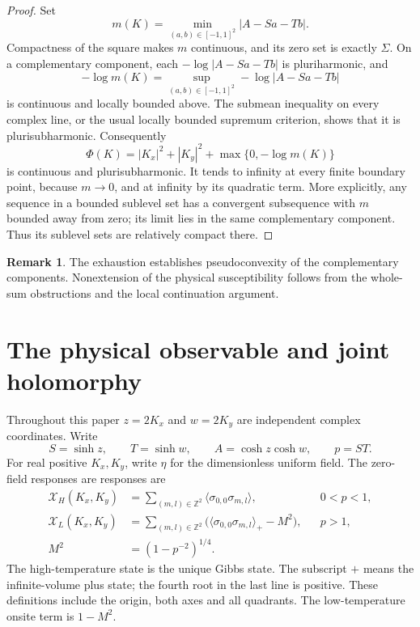 \documentclass[11pt]{article}
\numberwithin{equation}{section}
\theoremstyle{definition}
\newtheorem{remark}[theorem]{Remark}
\newcommand{\Z}{\mathbb Z}
\newcommand{\XH}{\mathcal X_H}
\newcommand{\XL}{\mathcal X_L}
\begin{document}
\begin{proof}
Set
\[
 m(K)=\min_{(a,b)\in[-1,1]^2}|A-Sa-Tb|.
\]
Compactness of the square makes \(m\) continuous, and
its zero set is exactly \(\Sigma\).
On a complementary component, each
\(-\log|A-Sa-Tb|\) is pluriharmonic, and
\[
 -\log m(K)=
       \sup_{(a,b)\in[-1,1]^2}-\log|A-Sa-Tb|
\]
is continuous and locally bounded above.
The submean inequality on every complex line, or the
usual locally bounded supremum criterion, shows that
it is plurisubharmonic.  Consequently
\[
 \Phi(K)=|K_x|^2+|K_y|^2+
                      \max\{0,-\log m(K)\}
\]
is continuous and plurisubharmonic.
It tends to infinity at every finite boundary point,
because \(m\to0\), and at infinity by its quadratic
term.  More explicitly, any sequence in a bounded
sublevel set has a convergent subsequence with
\(m\) bounded away from zero; its limit lies in the
same complementary component.  Thus its sublevel
sets are relatively compact there.
\end{proof}

\begin{remark}\label{geo:Hartogs-scope}
The exhaustion establishes pseudoconvexity of the complementary
components. Nonextension of the physical susceptibility follows
from the whole-sum obstructions and the local continuation argument.
\end{remark}

\section{The physical observable and joint holomorphy}
\label{ana:physical}

Throughout this paper \(z=2K_x\) and \(w=2K_y\) are independent
complex coordinates. Write
\[
 S=\sinh z,\qquad T=\sinh w,\qquad
 A=\cosh z\cosh w,\qquad p=ST.
\]
For real positive \(K_x,K_y\), write \(\eta\) for the
dimensionless uniform field. The zero-field responses are
responses are
\begin{align}
 \XH(K_x,K_y)
 &=\sum_{(m,l)\in\Z^2}\langle\sigma_{0,0}\sigma_{m,l}\rangle,
 &&0<p<1, \label{ana:physicalHT}\\
 \XL(K_x,K_y)
 &=\sum_{(m,l)\in\Z^2}
   \bigl(\langle\sigma_{0,0}\sigma_{m,l}\rangle_+-M^2\bigr),
 &&p>1, \label{ana:physicalLT}\\
 M^2&=(1-p^{-2})^{1/4}. \nonumber
\end{align}
The high-temperature state is the unique Gibbs state. The subscript
\(+\) means the infinite-volume plus state; the fourth root in the last
line is positive. These definitions include the origin, both axes and
all quadrants. The low-temperature onsite term is \(1-M^2\).
\end{document}
